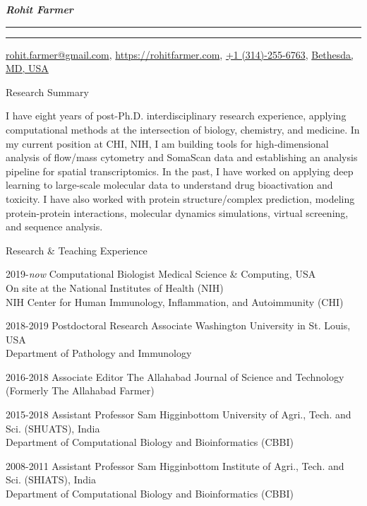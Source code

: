 \documentclass[10pt]{article}
\begin{document}
\settowidth{\cvlabelwidth}{%
\cvlabelfont 2009-2009%
}%
\begin{cv}{\huge \it \bfseries Rohit Farmer}
\vskip3pt
\hrule\hrule
\vskip3pt
\hfill \url{rohit.farmer@gmail.com},  \url{https://rohitfarmer.com}, \url{+1 (314)-255-6763}, \url{Bethesda, } \url{MD, USA}

{
\setlength{\cvlabelsep}{0mm}
\setlength{\cvlabelwidth}{0mm}
\begin{cvlist}{Research Summary}
	\item I have eight years of post-Ph.D. interdisciplinary research experience, applying computational methods at the intersection of biology, chemistry, and medicine. In my current position at CHI, NIH, I am building tools for high-dimensional analysis of flow/mass cytometry and SomaScan data and establishing an analysis pipeline for spatial transcriptomics. In the past, I have worked on applying deep learning to large-scale molecular data to understand drug bioactivation and toxicity. I have also worked with protein structure/complex prediction, modeling protein-protein interactions, molecular dynamics simulations, virtual screening, and sequence analysis. \end{cvlist}
}

\begin{cvlist}{Research \& Teaching Experience}
        \item[2019-\emph{now}] Computational Biologist \hfill Medical Science \& Computing, USA\\ \hspace*{\fill}On site at the National Institutes of Health (NIH)\\ \hspace*{\fill} NIH Center for Human Immunology, Inflammation, and Autoimmunity (CHI)
	\item[2018-2019] Postdoctoral Research Associate \hfill Washington University in St. Louis, USA\\  \hspace*{\fill} Department of Pathology and Immunology
	\item[2016-2018] Associate Editor \hfill The Allahabad Journal of Science and Technology \\  \hspace*{\fill} (Formerly The Allahabad Farmer)
        \item[2015-2018] Assistant Professor \hfill Sam Higginbottom University of Agri., Tech. and Sci. (SHUATS), India\\  \hspace*{\fill} Department of Computational Biology and Bioinformatics (CBBI)
        \item[2008-2011] Assistant Professor \hfill Sam Higginbottom Institute of Agri., Tech. and Sci. (SHIATS), India\\  \hspace*{\fill} Department of Computational Biology and Bioinformatics (CBBI)
\end{cvlist}


\end{cv}
\end{document}
